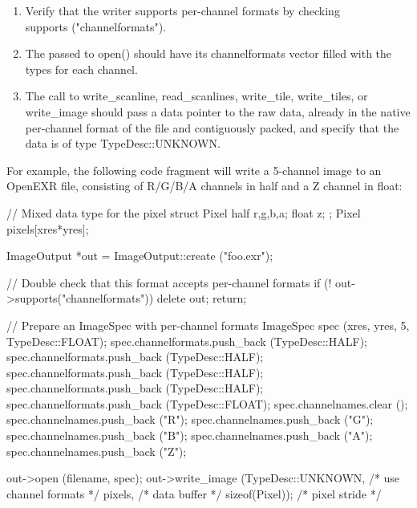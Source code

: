 \begin{enumerate}
\item Verify that the writer supports per-channel formats by checking \\
  {\cf supports ("channelformats")}.
\item The \ImageSpec passed to {\cf open()} should have its {\cf
  channelformats} vector filled with the types for each channel.
\item The call to {\cf write_scanline}, {\cf read_scanlines},
  {\cf write_tile}, {\cf write_tiles}, or {\cf
  write_image} should pass a {\cf data} pointer to the raw data, already
  in the native per-channel format of the file and contiguously packed,
  and specify that the data is of type {\cf TypeDesc::UNKNOWN}.
\end{enumerate}

For example, the following code fragment will write a 5-channel image
to an OpenEXR file, consisting of R/G/B/A channels in {\cf half} and
a Z channel in {\cf float}:

\begin{code}
        // Mixed data type for the pixel
        struct Pixel { half r,g,b,a; float z; };
        Pixel pixels[xres*yres];

        ImageOutput *out = ImageOutput::create ("foo.exr");

        // Double check that this format accepts per-channel formats
        if (! out->supports("channelformats")) {
            delete out;
            return;
        }

        // Prepare an ImageSpec with per-channel formats
        ImageSpec spec (xres, yres, 5, TypeDesc::FLOAT);
        spec.channelformats.push_back (TypeDesc::HALF);
        spec.channelformats.push_back (TypeDesc::HALF);
        spec.channelformats.push_back (TypeDesc::HALF);
        spec.channelformats.push_back (TypeDesc::HALF);
        spec.channelformats.push_back (TypeDesc::FLOAT);
        spec.channelnames.clear ();
        spec.channelnames.push_back ("R");
        spec.channelnames.push_back ("G");
        spec.channelnames.push_back ("B");
        spec.channelnames.push_back ("A");
        spec.channelnames.push_back ("Z");

        out->open (filename, spec);
        out->write_image (TypeDesc::UNKNOWN, /* use channel formats */
                          pixels,            /* data buffer */
                          sizeof(Pixel));    /* pixel stride */
\end{code}


